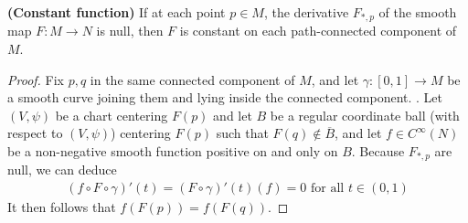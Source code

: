 \documentclass{report}
\begin{document}
\begin{theorem}
\textbf{(Constant function)} If at each point $p\in  M$, the derivative $F_{*,p}$ of the smooth map $F:M\rightarrow N$ is null, then $F$ is constant on each path-connected component of $M$. 
\end{theorem}
\begin{proof}
Fix $p,q$ in the same connected component of  $M$, and let  $\gamma :[0,1]\rightarrow M$ be a smooth curve joining them and lying inside the connected component. . Let $(V,\psi)$ be a chart centering $F(p)$ and let $B$ be a regular coordinate ball (with respect to $(V,\psi)$) centering  $F(p)$ such that $F(q)\not\in \overline{B}$, and let $f\in C^\infty (N)$ be a non-negative smooth function positive on and only on $B$. Because $F_{*,p}$ are null, we can deduce
\begin{align*}
  (f\circ F\circ \gamma )'(t)=(F\circ \gamma )'(t)(f)=0\text{ for all }t\in (0,1)
\end{align*}
It then follows that $f(F(p))=f(F(q))$. \CaC 
\end{proof}
\end{document}
